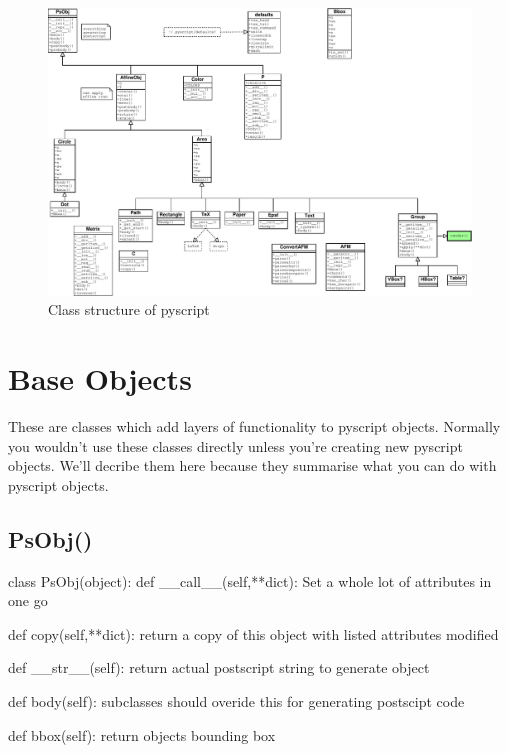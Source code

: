 \documentclass[a4paper]{book}
\begin{document}
\begin{figure}[h]
  \begin{center}
   \includegraphics{class_structure}
  \end{center}
  \caption{Class structure of pyscript}
  \label{fig:classes}
\end{figure}

\section{Base Objects}

These are classes which add layers of functionality to pyscript objects.
Normally you wouldn't use these classes directly unless you're creating new 
pyscript objects. We'll decribe them here because they summarise what
you can do with pyscript objects.

\subsection{PsObj()}
\label{sec:psobj}
\begin{python}
class PsObj(object):
    def __call__(self,**dict):
        Set a whole lot of attributes in one go

    def copy(self,**dict):
        return a copy of this object
        with listed attributes modified

    def __str__(self):
        return actual postscript string to generate object

    def body(self):
        subclasses should overide this for generating postscipt code

    def bbox(self):
        return objects bounding box
\end{python}
\end{document}
